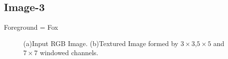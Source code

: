 \documentclass{article}
\begin{document}
\newpage
\subsection{Image-3}
Foreground = Fox\\
\begin{figure}[!htbp]
     \centering
     \captionsetup[subfigure]{labelformat=empty}
    \caption{(a)Input RGB Image. (b)Textured Image formed by $3\times 3$,$5\times 5$ and $7\times 7$ windowed channels.}
    \label{fig:fox_1}
\end{figure}
\end{document}
